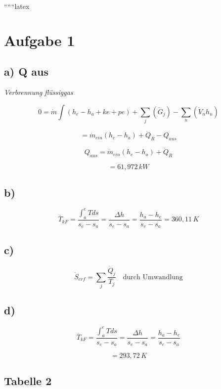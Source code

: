 
``````latex


\section*{Aufgabe 1}

\subsection*{a) Q aus}
\textit{Verbrennung flüssiggas}

\[
0 = \dot{m} \int (h_e - h_a + ke + pe) + \sum_j (\dot{G}_j) - \sum_n (\dot{V}_n h_n)
\]

\[
= \dot{m}_{ein} (h_e - h_a) + \dot{Q}_R - Q_{aus}
\]

\[
Q_{aus} = \dot{m}_{ein} (h_e - h_a) + \dot{Q}_R
\]

\[
= 61,972 \, kW
\]

\subsection*{b)}

\[
\overline{T}_{kF} = \frac{\int_{a}^{e} T ds}{s_e - s_a} = \frac{\Delta h}{s_e - s_a} = \frac{h_a - h_e}{s_e - s_a} = 360,11 \, K
\]

\subsection*{c)}

\[
\dot{S}_{erf} = \sum_j \frac{\dot{Q}_j}{T_j} \quad \text{durch Umwandlung}
\]

\subsection*{d)}

\[
\overline{T}_{kF} = \frac{\int_{a}^{e} T ds}{s_e - s_a} = \frac{\Delta h}{s_e - s_a} = \frac{h_a - h_e}{s_e - s_a}
\]

\[
= 293,72 \, K
\]

\subsection*{Tabelle 2}

